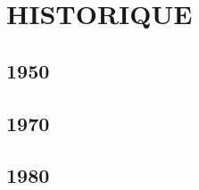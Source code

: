 \documentclass{beamer}
\begin{document}
\section{HISTORIQUE}
\subsection{1950}
\subsection{1970}
\subsection{1980}

% 

\end{document}
